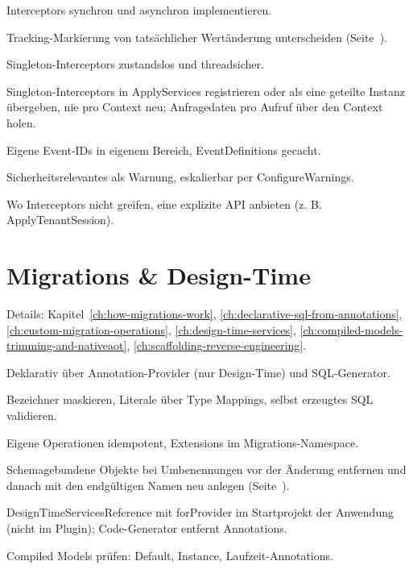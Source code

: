 \begin{checklist}
  \item Interceptors synchron und asynchron implementieren.
  \item Tracking-Markierung von tatsächlicher Wertänderung unterscheiden
    (Seite~\pageref{sec:tracking-flag-versus-value}).
  \item Singleton-Interceptors zustandslos und threadsicher.
  \item Singleton-Interceptors in ApplyServices registrieren oder als eine geteilte Instanz
    übergeben, nie pro Context neu; Anfragedaten pro Aufruf über den Context holen.
  \item Eigene Event-IDs in eigenem Bereich, EventDefinitions gecacht.
  \item Sicherheitsrelevantes als Warnung, eskalierbar per ConfigureWarnings.
  \item Wo Interceptors nicht greifen, eine explizite API anbieten (z. B. ApplyTenantSession).
\end{checklist}

\section{Migrations \& Design-Time}

\noindent Details: Kapitel~\ref{ch:how-migrations-work}, \ref{ch:declarative-sql-from-annotations}, \ref{ch:custom-migration-operations}, \ref{ch:design-time-services}, \ref{ch:compiled-models-trimming-and-nativeaot}, \ref{ch:scaffolding-reverse-engineering}.

\begin{checklist}
  \item Deklarativ über Annotation-Provider (nur Design-Time) und SQL-Generator.
  \item Bezeichner maskieren, Literale über Type Mappings, selbst erzeugtes SQL validieren.
  \item Eigene Operationen idempotent, Extensions im Migrations-Namespace.
  \item Schemagebundene Objekte bei Umbenennungen vor der Änderung entfernen und danach mit
    den endgültigen Namen neu anlegen (Seite~\pageref{sec:sqlserver-schema-bound-changes}).
  \item DesignTimeServicesReference mit forProvider im Startprojekt der Anwendung (nicht im Plugin); Code-Generator entfernt Annotations.
  \item Compiled Models prüfen: Default, Instance, Laufzeit-Annotations.
\end{checklist}

